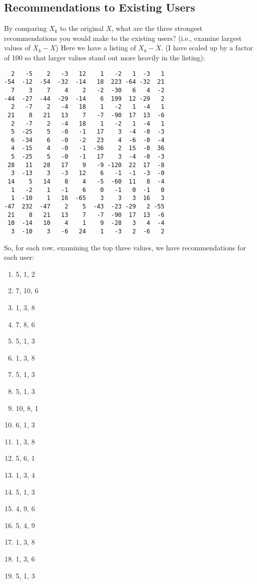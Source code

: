 \documentclass[12pt]{article}
\begin{document}
\subsection{Recommendations to Existing Users} %
\label{sub:recommendations_to_existing_users}
By comparing $X_k$ to the original $X$, what are the three strongest recommendations you would make to the existing users? (i.e., examine largest values of $X_k-X$)\newline
Here we have a listing of $X_k-X$. (I have scaled up by a factor of 100 so that larger values stand out more heavily in the listing):
\begin{lstlisting}
  2   -5    2   -3   12    1   -2   1  -3   1
-54  -12  -54  -32  -14   18  223 -64 -32  21
  7    3    7    4    2   -2  -30   6   4  -2
-44  -27  -44  -29  -14    6  199  12 -29   2
  2   -7    2   -4   18    1   -2   1  -4   1
 21    8   21   13    7   -7  -90  17  13  -6
  2   -7    2   -4   18    1   -2   1  -4   1
  5  -25    5   -0   -1   17    3  -4  -0  -3
  6  -34    6   -0   -2   23    4  -6  -0  -4
  4  -15    4   -0   -1  -36    2  15  -0  36
  5  -25    5   -0   -1   17    3  -4  -0  -3
 28   11   28   17    9   -9 -120  22  17  -8
  3  -13    3   -3   12    6   -1  -1  -3  -0
 14    5   14    8    4   -5  -60  11   8  -4
  1   -2    1   -1    6    0   -1   0  -1   0
  1  -10    1   16  -65    3    3   3  16   3
-47  232  -47    2    5  -43  -23 -29   2 -55
 21    8   21   13    7   -7  -90  17  13  -6
 10  -14   10    4    1    9  -28   3   4  -4
  3  -10    3   -6   24    1   -3   2  -6   2
\end{lstlisting}
So, for each row, examining the top three values, we have recommendations for each user:
\begin{enumerate}
  \item 5, 1, 2
  \item 7, 10, 6
  \item 1, 3, 8
  \item 7, 8, 6
  \item 5, 1, 3
  \item 1, 3, 8
  \item 5, 1, 3
  \item 5, 1, 3
  \item 10, 8, 1
  \item 6, 1, 3
  \item 1, 3, 8
  \item 5, 6, 1
  \item 1, 3, 4
  \item 5, 1, 3
  \item 4, 9, 6
  \item 5, 4, 9
  \item 1, 3, 8
  \item 1, 3, 6
  \item 5, 1, 3
\end{enumerate}
\end{document}
